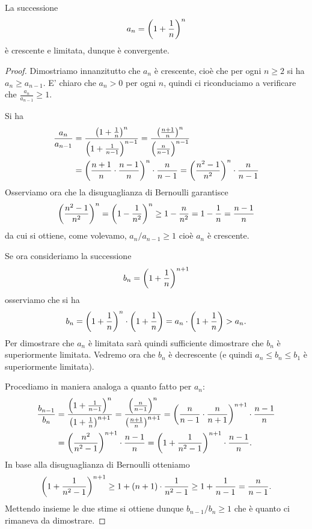 \begin{theorem}
\mymark{**}
La successione
\[
  a_n = {\left( 1+\frac 1 n \right)}^n
\]
è crescente e limitata, dunque è convergente.
\end{theorem}
%
\begin{proof}
Dimostriamo innanzitutto che $a_n$ è crescente, cioè che
per ogni $n\ge 2$ si ha $a_n \ge a_{n-1}$.
E' chiaro che $a_n>0$ per ogni $n$,
quindi ci riconduciamo a
verificare che $\frac{a_n}{a_{n-1}} \ge 1$.

Si ha
\begin{align*}
\frac{a_n}{a_{n-1}}
&= \frac{{\left( 1+\frac 1 n \right)}^n}{{\left( 1+\frac 1 {n-1} \right)}^{n-1}}
= \frac{{\left( \frac{n+1}{n} \right)}^n}{{\left( \frac{n}{n-1} \right)}^{n-1}}\\
&= {\left( \frac{n+1}{n}\cdot\frac{n-1}{n} \right)}^n \cdot \frac{n}{n-1}
= {\left( \frac{n^2- 1}{n^2} \right)}^n \cdot \frac{n}{n-1}
\end{align*}
Osserviamo ora che la disuguaglianza di Bernoulli garantisce
\[
  {\left( \frac{n^2 -1}{n^2} \right)}^n
  = {\left( 1-\frac{1}{n^2} \right)}^n
  \ge 1 - \frac{n}{n^2} = 1 - \frac{1}{n} = \frac{n-1}{n}
\]
da cui si ottiene, come volevamo, $a_n / a_{n-1} \ge 1$ cioè
$a_n$ è crescente.

Se ora consideriamo la successione
\[
  b_n = {\left( 1+\frac 1 n \right)}^{n+1}
\]
osserviamo che si ha
\[
  b_n = {\left( 1+\frac 1 n \right)}^n \cdot {\left( 1+\frac 1 n \right)}
   = a_n\cdot {\left( 1+\frac 1 n \right)} > a_n.
\]
Per dimostrare che $a_n$ è limitata sarà quindi sufficiente dimostrare
che $b_n$ è superiormente limitata. Vedremo ora che $b_n$ è decrescente (e quindi $a_n \le b_n \le b_1$ è superiormente limitata).

Procediamo in maniera analoga a quanto fatto per $a_n$:
\begin{align*}
\frac{b_{n-1}}{b_n}
& = \frac{{\left( 1+\frac{1}{n-1} \right)}^n}{{\left( 1+\frac{1}{n} \right)}^{n+1}}
  = \frac{{\left( \frac{n}{n-1} \right)}^n}{{\left( \frac{n+1}{n} \right)}^{n+1}}
  = {\left( \frac{n}{n-1}\cdot\frac{n}{n+1} \right)}^{n+1}\cdot\frac{n-1}{n} \\
& = {\left( \frac{n^2}{n^2-1} \right)}^{n+1} \cdot \frac{n-1}{n}
  = {\left( 1 + \frac{1}{n^2-1} \right)}^{n+1} \cdot \frac{n-1}{n}.
\end{align*}
In base alla disuguaglianza di Bernoulli otteniamo
\[
  {\left( 1 + \frac{1}{n^2-1} \right)}^{n+1}
  \ge 1 + (n+1) \cdot \frac{1}{n^2-1}
  \ge 1 + \frac{1}{n-1} = \frac{n}{n-1}.
\]
Mettendo insieme le due stime si ottiene dunque $b_{n-1}/b_n \ge 1$
che è quanto ci rimaneva da dimostrare.
\end{proof}

